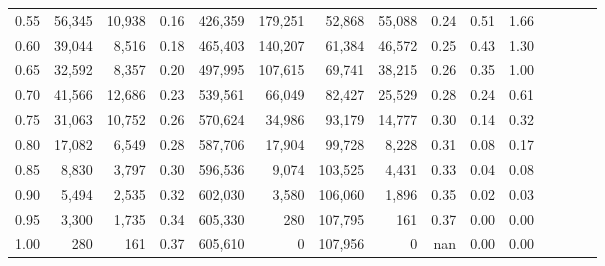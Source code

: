 \begin{tabular}{rrrcrrrrrrrrrrr}
0.55 &  56,345 &  10,938 &                                       0.16 &  426,359 &  179,251 &   52,868 &   55,088 &  0.24 &  0.51 &                         1.66 \\
0.60 &  39,044 &   8,516 &                                       0.18 &  465,403 &  140,207 &   61,384 &   46,572 &  0.25 &  0.43 &                         1.30 \\
0.65 &  32,592 &   8,357 &                                       0.20 &  497,995 &  107,615 &   69,741 &   38,215 &  0.26 &  0.35 &                         1.00 \\
0.70 &  41,566 &  12,686 &                                       0.23 &  539,561 &   66,049 &   82,427 &   25,529 &  0.28 &  0.24 &                         0.61 \\
0.75 &  31,063 &  10,752 &                                       0.26 &  570,624 &   34,986 &   93,179 &   14,777 &  0.30 &  0.14 &                         0.32 \\
0.80 &  17,082 &   6,549 &                                       0.28 &  587,706 &   17,904 &   99,728 &    8,228 &  0.31 &  0.08 &                         0.17 \\
0.85 &   8,830 &   3,797 &                                       0.30 &  596,536 &    9,074 &  103,525 &    4,431 &  0.33 &  0.04 &                         0.08 \\
0.90 &   5,494 &   2,535 &                                       0.32 &  602,030 &    3,580 &  106,060 &    1,896 &  0.35 &  0.02 &                         0.03 \\
0.95 &   3,300 &   1,735 &                                       0.34 &  605,330 &      280 &  107,795 &      161 &  0.37 &  0.00 &                         0.00 \\
1.00 &     280 &     161 &                                       0.37 &  605,610 &        0 &  107,956 &        0 &   nan &  0.00 &                         0.00 \\
\bottomrule
\end{tabular}
